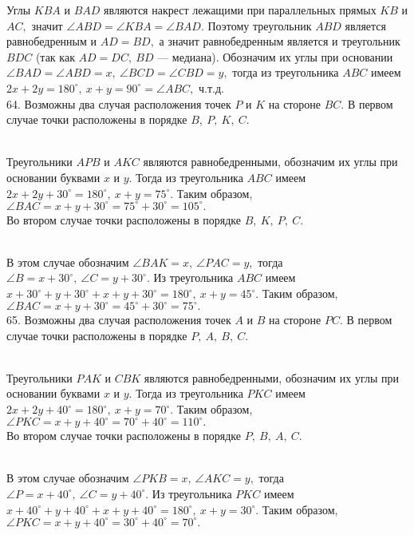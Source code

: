 Углы $KBA$ и $BAD$ являются накрест лежащими при параллельных прямых $KB$ и $AC,$ значит $\angle ABD=\angle KBA=\angle BAD.$ Поэтому треугольник $ABD$ является равнобедренным и $AD=BD,$ а значит равнобедренным является и треугольник $BDC$ (так как $AD=DC,\ BD$ --- медиана). Обозначим их углы при основании $\angle BAD=\angle ABD=x,\ \angle BCD=\angle CBD=y,$ тогда из треугольника $ABC$ имеем $2x+2y=180^\circ,\ x+y=90^\circ=\angle ABC,$ ч.т.д.\\
64. Возможны два случая расположения точек $P$ и $K$ на стороне $BC.$ В первом случае точки расположены в порядке $B,\ P,\ K,\ C.$
\begin{figure}[ht!]
\end{figure}\\
Треугольники $APB$ и $AKC$ являются равнобедренными, обозначим их углы при основании буквами $x$ и $y.$ Тогда из треугольника $ABC$ имеем $2x+2y+30^\circ=180^\circ,\ x+y=75^\circ.$ Таким образом, $\angle BAC=x+y+30^\circ=75^\circ+30^\circ=105^\circ.$\\
Во втором случае точки расположены в порядке $B,\ K,\ P,\ C.$
\begin{figure}[ht!]
\end{figure}\\
В этом случае обозначим $\angle BAK=x,\ \angle PAC=y,$ тогда $\angle B=x+30^\circ,\ \angle C=y+30^\circ.$ Из треугольника $ABC$ имеем $x+30^\circ+y+30^\circ+x+y+30^\circ=180^\circ,\ x+y=45^\circ.$ Таким образом, $\angle BAC=x+y+30^\circ=45^\circ+30^\circ=75^\circ.$\\
65. Возможны два случая расположения точек $A$ и $B$ на стороне $PC.$ В первом случае точки расположены в порядке $P,\ A,\ B,\ C.$
\begin{figure}[ht!]
\end{figure}\\
Треугольники $PAK$ и $CBK$ являются равнобедренными, обозначим их углы при основании буквами $x$ и $y.$ Тогда из треугольника $PKC$ имеем $2x+2y+40^\circ=180^\circ,\ x+y=70^\circ.$ Таким образом, $\angle PKC=x+y+40^\circ=70^\circ+40^\circ=110^\circ.$\\
Во втором случае точки расположены в порядке $P,\ B,\ A,\ C.$
\begin{figure}[ht!]
\end{figure}\\
В этом случае обозначим $\angle PKB=x,\ \angle AKC=y,$ тогда $\angle P=x+40^\circ,\ \angle C=y+40^\circ.$ Из треугольника $PKC$ имеем $x+40^\circ+y+40^\circ+x+y+40^\circ=180^\circ,\ x+y=30^\circ.$ Таким образом, $\angle PKC=x+y+40^\circ=30^\circ+40^\circ=70^\circ.$\\
